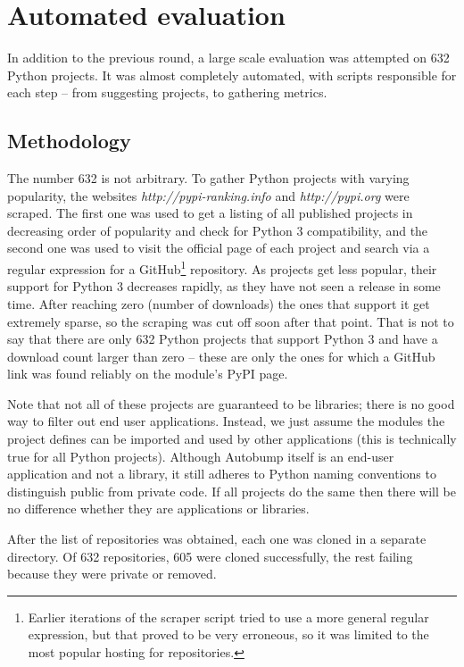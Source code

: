 \documentclass{l4proj}
\begin{document}
\section{Automated evaluation}

In addition to the previous round, a large scale evaluation was
attempted on 632 Python projects. It was almost completely automated,
with scripts \cite{EvalScripts} responsible for each step -- from
suggesting projects, to gathering metrics.

\subsection{Methodology}

The number 632 is not arbitrary. To gather Python projects with
varying popularity, the websites \textit{http://pypi-ranking.info} and
\textit{http://pypi.org} were scraped. The first one was used to get a
listing of all published projects in decreasing order of popularity
and check for Python 3 compatibility, and the second one was used to
visit the official page of each project and search via a regular
expression for a GitHub\footnote{Earlier iterations of the scraper
script tried to use a more general regular expression, but that proved
to be very erroneous, so it was limited to the most popular hosting
for repositories.} repository. As projects get less popular, their
support for Python 3 decreases rapidly, as they have not seen a
release in some time. After reaching zero (number of downloads) the
ones that support it get extremely sparse, so the scraping was cut off
soon after that point. That is not to say that there are only 632
Python projects that support Python 3 and have a download count larger
than zero -- these are only the ones for which a GitHub link was found
reliably on the module's PyPI page.

Note that not all of these projects are guaranteed to be libraries;
there is no good way to filter out end user applications. Instead, we
just assume the modules the project defines can be imported and used
by other applications (this is technically true for all Python
projects). Although Autobump itself is an end-user application and not
a library, it still adheres to Python naming conventions to
distinguish public from private code. If all projects do the same then
there will be no difference whether they are applications or
libraries.

After the list of repositories was obtained, each one was cloned in a
separate directory. Of 632 repositories,
605 were cloned successfully, the rest failing because they were
private or removed.
\end{document}
